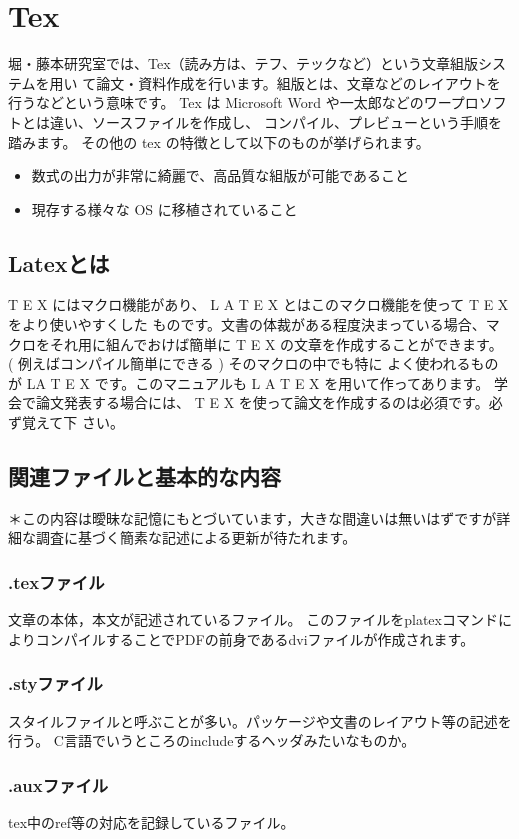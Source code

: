 \documentclass[a4paper,10pt,twocolumn,fleqn]{jarticle}
\begin{document}
\section{Tex}
堀・藤本研究室では、Tex（読み方は、テフ、テックなど）という文章組版システムを用い
て論文・資料作成を行います。組版とは、文章などのレイアウトを行うなどという意味です。
Tex は Microsoft Word や一太郎などのワープロソフトとは違い、ソースファイルを作成し、
コンパイル、プレビューという手順を踏みます。
その他の tex の特徴として以下のものが挙げられます。

\begin{itemize}
	\item  数式の出力が非常に綺麗で、高品質な組版が可能であること
	\item 現存する様々な OS に移植されていること
\end{itemize}

\subsection{Latexとは}
T E X にはマクロ機能があり、 L A T E X とはこのマクロ機能を使って T E X をより使いやすくした
ものです。文書の体裁がある程度決まっている場合、マクロをそれ用に組んでおけば簡単に T E X
の文章を作成することができます。 ( 例えばコンパイル簡単にできる ) そのマクロの中でも特に
よく使われるものが LA T E X です。このマニュアルも L A T E X を用いて作ってあります。
学会で論文発表する場合には、 T E X を使って論文を作成するのは必須です。必ず覚えて下
さい。

\subsection{関連ファイルと基本的な内容}
＊この内容は曖昧な記憶にもとづいています，大きな間違いは無いはずですが詳細な調査に基づく簡素な記述による更新が待たれます。
\subsubsection*{.texファイル}
文章の本体，本文が記述されているファイル。
このファイルをplatexコマンドによりコンパイルすることでPDFの前身であるdviファイルが作成されます。
\subsubsection*{.styファイル}
スタイルファイルと呼ぶことが多い。パッケージや文書のレイアウト等の記述を行う。
C言語でいうところのincludeするヘッダみたいなものか。
\subsubsection*{.auxファイル}
tex中のref等の対応を記録しているファイル。
\end{document}
